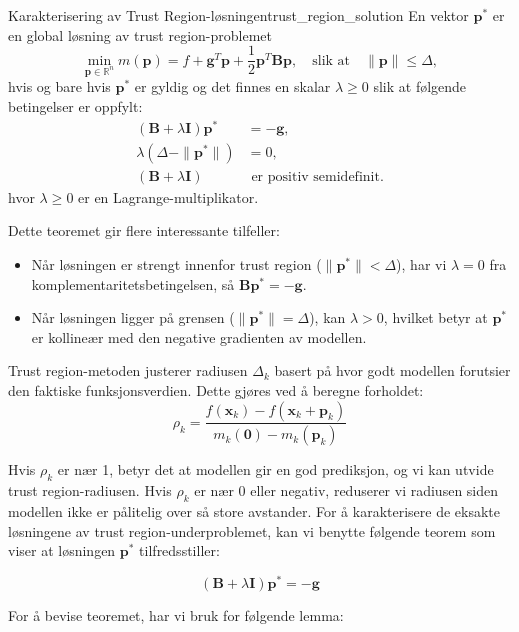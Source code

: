 \begin{theorem}{Karakterisering av Trust Region-løsningen}{trust_region_solution}
	En vektor $\symbf{p}^\ast$ er en global løsning av trust region-problemet
	\[
		\min_{\symbf{p} \in \mathbb{R}^n} m(\symbf{p}) = f + \symbf{g}^T\symbf{p} + \frac{1}{2}\symbf{p}^T\symbf{B}\symbf{p}, \quad \text{slik at} \quad \|\symbf{p}\| \leq \Delta,
	\]
	hvis og bare hvis $\symbf{p}^\ast$ er gyldig og det finnes en skalar $\lambda \geq 0$ slik at følgende betingelser er oppfylt:
	\begin{align}
		(\symbf{B} + \lambda\symbf{I})\symbf{p}^\ast & = -\symbf{g},                   \\
		\lambda(\Delta - \|\symbf{p}^\ast\|)         & = 0,                            \\
		(\symbf{B} + \lambda\symbf{I})               & \text{ er positiv semidefinit.}
	\end{align}
	hvor $\lambda \geq 0$ er en Lagrange-multiplikator.
\end{theorem}

Dette teoremet gir flere interessante tilfeller:
\begin{itemize}
	\item Når løsningen er strengt innenfor trust region ($\|\symbf{p}^\ast\| < \Delta$), har vi $\lambda = 0$ fra komplementaritetsbetingelsen, så $\symbf{B}\symbf{p}^\ast = -\symbf{g}$.
	\item Når løsningen ligger på grensen ($\|\symbf{p}^\ast\| = \Delta$), kan $\lambda > 0$, hvilket betyr at $\symbf{p}^\ast$ er kollineær med den negative gradienten av modellen.
\end{itemize}

Trust region-metoden justerer radiusen $\Delta_k$ basert på hvor godt modellen forutsier den faktiske funksjonsverdien. Dette gjøres ved å beregne forholdet:
\[
	\rho_k = \frac{f(\symbf{x}_k) - f(\symbf{x}_k + \symbf{p}_k)}{m_k(\symbf{0}) - m_k(\symbf{p}_k)}
\]

Hvis $\rho_k$ er nær 1, betyr det at modellen gir en god prediksjon, og vi kan utvide trust region-radiusen. Hvis $\rho_k$ er nær 0 eller negativ, reduserer vi radiusen siden modellen ikke er pålitelig over så store avstander.
For å karakterisere de eksakte løsningene av trust region-underproblemet, kan vi benytte følgende teorem som viser at løsningen $\symbf{p}^\ast$ tilfredsstiller:

\[
	(\symbf{B} + \lambda \symbf{I})\symbf{p}^\ast = -\symbf{g}
\]

For å bevise teoremet, har vi bruk for følgende lemma:

